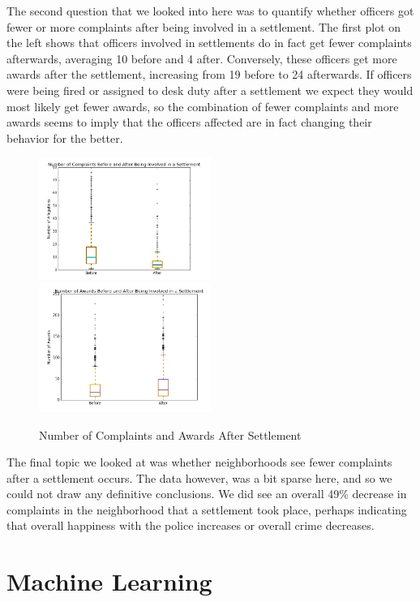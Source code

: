 \documentclass[11pt]{article}
\begin{document}
The second question that we looked into here was to quantify whether officers got fewer or more complaints after being involved in a settlement. The first plot on the left shows that officers involved in settlements do in fact get fewer complaints afterwards, averaging 10 before and 4 after. Conversely, these officers get more awards after the settlement, increasing from 19 before to 24 afterwards. If officers were being fired or assigned to desk duty after a settlement we expect they would most likely get fewer awards, so the combination of fewer complaints and more awards seems to imply that the officers affected are in fact changing their behavior for the better.

\begin{figure}[h!]
\caption{Number of Complaints and Awards After Settlement}
\includegraphics[width=0.5\textwidth]{settb.png}
\includegraphics[width=0.5\textwidth]{awards.png}
\end{figure}

The final topic we looked at was whether neighborhoods see fewer complaints after a settlement occurs. The data however, was a bit sparse here, and so we could not draw any definitive conclusions. We did see an overall 49\% decrease in complaints in the neighborhood that a settlement took place, perhaps indicating that overall happiness with the police increases or overall crime decreases.

\FloatBarrier
\section{Machine Learning}
\end{document}
